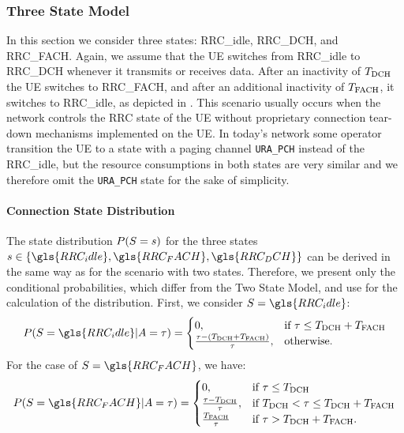 \subsubsection*{Three State Model}\label{sec:network:performance_model:analytical_model:three_states}
In this section we consider three states: \gls{RRC_idle}, \gls{RRC_DCH}, and \gls{RRC_FACH}.
Again, we assume that the \gls{UE} switches from \gls{RRC_idle} to \gls{RRC_DCH} whenever it transmits or receives data.
After an inactivity of \(T_{\text{DCH}}\) the \gls{UE} switches to \gls{RRC_FACH}, and after an additional inactivity of \(T_{\text{FACH}}\), it switches to \gls{RRC_idle}, as depicted in .
This scenario usually occurs when the network controls the \gls{RRC} state of the \gls{UE} without proprietary connection tear-down mechanisms implemented on the \gls{UE}.
In today's network some operator transition the \gls{UE} to a state with a paging channel \texttt{URA\_PCH} instead of the \gls{RRC_idle}, but the resource consumptions in both states are very similar and we therefore omit the \texttt{URA\_PCH} state for the sake of simplicity.

\paragraph*{Connection State Distribution}
The state distribution \(P(S=s)\) for the three states \(\RRCStateRealization\in\{\gls{RRC_idle},\gls{RRC_FACH},\gls{RRC_DCH}\}\) can be derived in the same way as for the scenario with two states.
Therefore, we present only the conditional probabilities, which differ from the Two State Model, and use  for the calculation of the distribution.
First, we consider \(\RRCState=\gls{RRC_idle}\):
\begin{equation*}
P(\RRCState=\gls{RRC_idle} \vert \PacketIAT = \ObservationIntervalLength) =
\begin{cases}
	0,  & \mbox{if } \ObservationIntervalLength \leq \TDCH+\TFACH \\
	\frac{\ObservationIntervalLength - (\TDCH+\TFACH)}{\ObservationIntervalLength},
	    & \mbox{otherwise.}
\end{cases}
\end{equation*}
For the case of \(\RRCState=\gls{RRC_FACH}\), we have:
\begin{equation*}
P(\RRCState=\gls{RRC_FACH} \vert \PacketIAT = \ObservationIntervalLength) =
\begin{cases}
	0,  & \mbox{if } \ObservationIntervalLength \leq \TDCH \\
	\frac{\ObservationIntervalLength - \TDCH}{\ObservationIntervalLength},
	    & \mbox{if }\TDCH<\ObservationIntervalLength\leq \TDCH+\TFACH \\
	\frac{\TFACH}{\ObservationIntervalLength}
	    & \mbox{if } \ObservationIntervalLength > \TDCH+\TFACH.
\end{cases}
\end{equation*}

